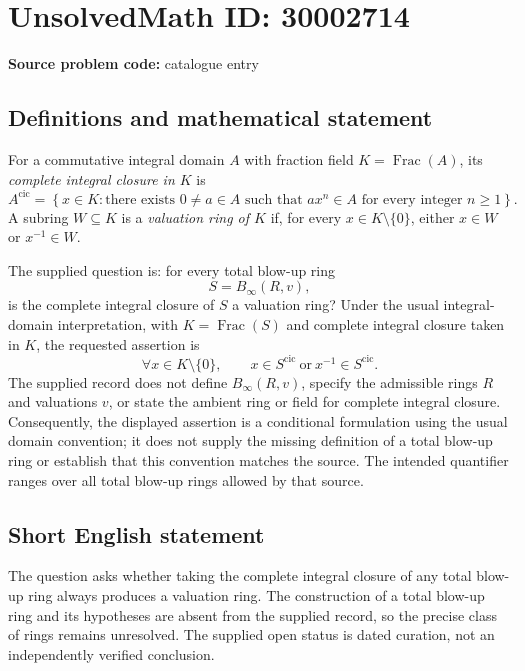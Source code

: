 \documentclass[11pt]{article}
\begin{document}
\section*{UnsolvedMath ID: 30002714}
\textbf{Source problem code:} catalogue entry
\subsection{Definitions and mathematical statement}
For a commutative integral domain \(A\) with fraction field \(K=\operatorname{Frac}(A)\), its \emph{complete integral closure in \(K\)} is
\[
A^{\mathrm{cic}}=\left\{x\in K:\text{there exists }0\ne a\in A\text{ such that }ax^n\in A\text{ for every integer }n\geq 1\right\}.
\]
A subring \(W\subseteq K\) is a \emph{valuation ring of \(K\)} if, for every \(x\in K\setminus\{0\}\), either \(x\in W\) or \(x^{-1}\in W\).

The supplied question is: for every total blow-up ring
\[
S=B_{\infty}(R,v),
\]
is the complete integral closure of \(S\) a valuation ring? Under the usual integral-domain interpretation, with \(K=\operatorname{Frac}(S)\) and complete integral closure taken in \(K\), the requested assertion is
\[
\forall x\in K\setminus\{0\},\qquad x\in S^{\mathrm{cic}}\ \text{or}\ x^{-1}\in S^{\mathrm{cic}}.
\]
The supplied record does not define \(B_{\infty}(R,v)\), specify the admissible rings \(R\) and valuations \(v\), or state the ambient ring or field for complete integral closure. Consequently, the displayed assertion is a conditional formulation using the usual domain convention; it does not supply the missing definition of a total blow-up ring or establish that this convention matches the source. The intended quantifier ranges over all total blow-up rings allowed by that source.
\subsection{Short English statement}
The question asks whether taking the complete integral closure of any total blow-up ring always produces a valuation ring. The construction of a total blow-up ring and its hypotheses are absent from the supplied record, so the precise class of rings remains unresolved. The supplied open status is dated curation, not an independently verified conclusion.
\end{document}
